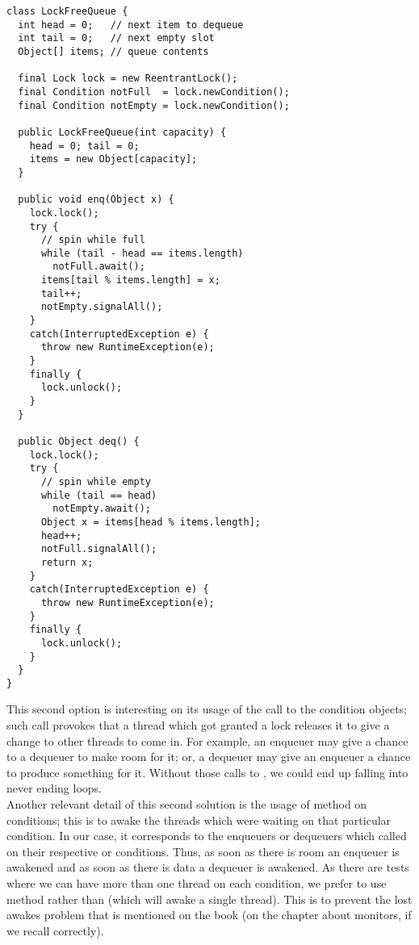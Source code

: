 \newpage
\begin{lstlisting}[style=nonumbers]
class LockFreeQueue {
  int head = 0;   // next item to dequeue
  int tail = 0;   // next empty slot
  Object[] items; // queue contents

  final Lock lock = new ReentrantLock();
  final Condition notFull  = lock.newCondition(); 
  final Condition notEmpty = lock.newCondition(); 

  public LockFreeQueue(int capacity) {
    head = 0; tail = 0;
    items = new Object[capacity];
  }

  public void enq(Object x) {
    lock.lock();
    try {
      // spin while full
      while (tail - head == items.length) 
        notFull.await();
      items[tail % items.length] = x;
      tail++;
      notEmpty.signalAll();
    }
    catch(InterruptedException e) {
      throw new RuntimeException(e);
    }
    finally {
      lock.unlock();
    }
  }

  public Object deq() {
    lock.lock();
    try {
      // spin while empty
      while (tail == head)
        notEmpty.await();
      Object x = items[head % items.length];
      head++;
      notFull.signalAll();
      return x;
    }
    catch(InterruptedException e) {
      throw new RuntimeException(e);
    }
    finally {
      lock.unlock();
    }
  }
}  
\end{lstlisting}
\hfill

This second option is interesting on its usage of the  call
to the condition objects; such call provokes that a thread which got
granted a lock releases it to give a change to other threads to come
in. For example, an enqueuer may give a chance to a dequeuer to make
room for it; or, a dequeuer may give an enqueuer a chance to produce
something for it. Without those calls to , we could end up
falling into never ending loops. \\

Another relevant detail of this second solution is the usage of
  method on conditions; this is to awake the threads
which were waiting on that particular condition. In our 
case, it corresponds to the enqueuers or dequeuers which
called  on their respective  or 
conditions. Thus, as soon as there is room an enqueuer is awakened
and as soon as there is data a dequeuer is awakened. As there are
tests where we can have more than one thread on each condition, we
prefer to use  method rather than  (which will
awake a single thread). This is to prevent the lost awakes problem
that is mentioned on the book (on the chapter about monitors, if we
recall correctly).



